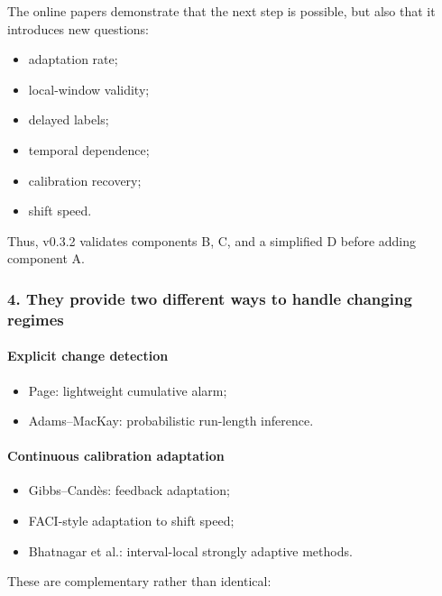 The online papers demonstrate that the next step is possible, but also that it introduces new questions:

\begin{itemize}
\tightlist
\item
  adaptation rate;
\item
  local-window validity;
\item
  delayed labels;
\item
  temporal dependence;
\item
  calibration recovery;
\item
  shift speed.
\end{itemize}

Thus, v0.3.2 validates components B, C, and a simplified D before adding component A.

\subsubsection{4. They provide two different ways to handle changing regimes}\label{they-provide-two-different-ways-to-handle-changing-regimes}

\paragraph{Explicit change detection}\label{explicit-change-detection}

\begin{itemize}
\tightlist
\item
  Page: lightweight cumulative alarm;
\item
  Adams--MacKay: probabilistic run-length inference.
\end{itemize}

\paragraph{Continuous calibration adaptation}\label{continuous-calibration-adaptation}

\begin{itemize}
\tightlist
\item
  Gibbs--Candès: feedback adaptation;
\item
  FACI-style adaptation to shift speed;
\item
  Bhatnagar et al.: interval-local strongly adaptive methods.
\end{itemize}

These are complementary rather than identical:

